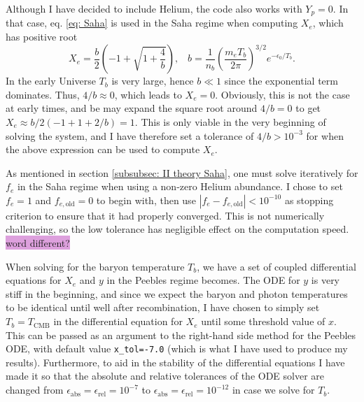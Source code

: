 \documentclass{aa}
\numberwithin{equation}{section}
\numberwithin{table}{section}
\numberwithin{figure}{section}
\begin{document}
Although I have decided to include Helium, the code also works with $Y_p=0$. In that case, eq. \eqref{eq: Saha} is used in the Saha regime when computing $X_e$, which has positive root
\begin{equation}
  X_e = \frac{b}{2}\left(-1+\sqrt{1 + \frac{4}{b}}\right), \hspace{10pt} b = \frac{1}{n_b}\left( \frac{m_eT_b}{2\pi}\right)^{3/2}e^{-\epsilon_0/T_b}.
\end{equation}
In the early Universe $T_b$ is very large, hence $b\ll 1$ since the exponential term dominates. Thus, $4/b\approx0$, which leads to $X_e = 0$. Obviously, this is not the case at early times, and be may expand the square root around $4/b = 0$ to get $X_e \approx b/2(-1 + 1 + 2/b)=1$. This is only viable in the very beginning of solving the system, and I have therefore set a tolerance of $4/b>10^{-3}$ for when the above expression can be used to compute $X_e$.

As mentioned in section \ref{subsubsec: II theory Saha}, one must solve iteratively for $f_e$ in the Saha regime when using a non-zero Helium abundance. I chose to set $f_e = 1$ and $f_{e,\text{old}}=0$ to begin with, then use $\left|f_e-f_{e,\text{old}}\right|<10^{-10}$ as stopping criterion to ensure that it had properly converged. This is not numerically challenging, so the low tolerance has negligible effect on the computation speed. \colorbox{Plum}{word different?}

When solving for the baryon temperature $T_b$, we have a set of coupled differential equations for $X_e$ and $y$ in the Peebles regime becomes. The ODE for $y$ is very stiff in the beginning, and since we expect the baryon and photon temperatures to be identical until well after recombination, I have chosen to simply set $T_b=T_\text{CMB}$ in the differential equation for $X_e$ until some threshold value of $x$. This can be passed as an argument to the right-hand side method for the Peebles ODE, with default value \verb|x_tol=-7.0| (which is what I have used to produce my results). Furthermore, to aid in the stability of the differential equations I have made it so that the absolute and relative tolerances of the ODE solver are changed from $\epsilon_\text{abs}=\epsilon_\text{rel}=10^{-7}$ to $\epsilon_\text{abs}=\epsilon_\text{rel}=10^{-12}$ in case we solve for $T_b$. 
\end{document}

